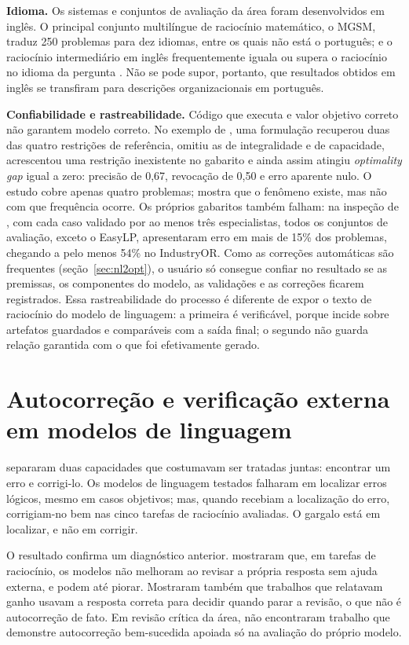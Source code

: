 \textbf{Idioma.} Os sistemas e conjuntos de avaliação da área foram desenvolvidos em inglês. O principal conjunto multilíngue de raciocínio matemático, o MGSM, traduz 250 problemas para dez idiomas, entre os quais não está o português; e o raciocínio intermediário em inglês frequentemente iguala ou supera o raciocínio no idioma da pergunta \cite{shi2023}. Não se pode supor, portanto, que resultados obtidos em inglês se transfiram para descrições organizacionais em português.

\textbf{Confiabilidade e rastreabilidade.} Código que executa e valor objetivo correto não garantem modelo correto. No exemplo de , uma formulação recuperou duas das quatro restrições de referência, omitiu as de integralidade e de capacidade, acrescentou uma restrição inexistente no gabarito e ainda assim atingiu \textit{optimality gap} igual a zero: precisão de 0,67, revocação de 0,50 e erro aparente nulo. O estudo cobre apenas quatro problemas; mostra que o fenômeno existe, mas não com que frequência ocorre. Os próprios gabaritos também falham: na inspeção de , com cada caso validado por ao menos três especialistas, todos os conjuntos de avaliação, exceto o EasyLP, apresentaram erro em mais de 15\% dos problemas, chegando a pelo menos 54\% no IndustryOR. Como as correções automáticas são frequentes (seção~\ref{sec:nl2opt}), o usuário só consegue confiar no resultado se as premissas, os componentes do modelo, as validações e as correções ficarem registrados. Essa rastreabilidade do processo é diferente de expor o texto de raciocínio do modelo de linguagem: a primeira é verificável, porque incide sobre artefatos guardados e comparáveis com a saída final; o segundo não guarda relação garantida com o que foi efetivamente gerado.

\section{Autocorreção e verificação externa em modelos de linguagem}
\label{sec:autocorrecao}

 separaram duas capacidades que costumavam ser tratadas juntas: encontrar um erro e corrigi-lo. Os modelos de linguagem testados falharam em localizar erros lógicos, mesmo em casos objetivos; mas, quando recebiam a localização do erro, corrigiam-no bem nas cinco tarefas de raciocínio avaliadas. O gargalo está em localizar, e não em corrigir.

O resultado confirma um diagnóstico anterior.  mostraram que, em tarefas de raciocínio, os modelos não melhoram ao revisar a própria resposta sem ajuda externa, e podem até piorar. Mostraram também que trabalhos que relatavam ganho usavam a resposta correta para decidir quando parar a revisão, o que não é autocorreção de fato. Em revisão crítica da área,  não encontraram trabalho que demonstre autocorreção bem-sucedida apoiada só na avaliação do próprio modelo.

